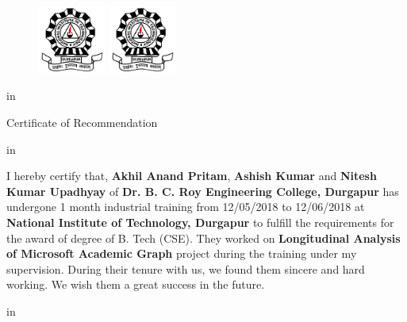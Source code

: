 \mbox{}
\thispagestyle{empty}
\newpage





\begin{titlepage}
\begin{figure}
\centering
\ifpdf
\includegraphics[width=0.2\textwidth]{NIT_Logo.jpg}   %
\else
\includegraphics[width=0.2\textwidth]{NIT_Logo.jpg}       %
\fi
\end{figure}
 in
\begin{center}
\huge Certificate of Recommendation
\end{center}
 in

I hereby certify that, \textbf{Akhil Anand Pritam}, \textbf{Ashish Kumar} and \textbf{Nitesh Kumar Upadhyay} of \textbf{Dr. B. C. Roy Engineering College, Durgapur} has undergone 1 month industrial training from 12/05/2018 to 12/06/2018 at \textbf{National Institute of Technology, Durgapur} to fulfill the requirements for the award of degree of B. Tech (CSE). They worked on \textbf{Longitudinal Analysis of Microsoft Academic Graph} project during the training under my supervision. During their tenure with us, we found them sincere and hard working. We wish them a great success in the future.


 in




\end{titlepage}
